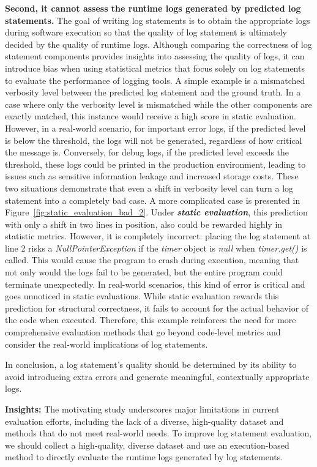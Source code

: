 \textbf{Second, it cannot assess the runtime logs generated by predicted log statements. }
The goal of writing log statements is to obtain the appropriate logs during software execution so that the quality of log statement is ultimately decided by the quality of runtime logs. 
Although comparing the correctness of log statement components provides insights into assessing the quality of logs, it can introduce bias when using statistical metrics that focus solely on log statements to evaluate the performance of logging tools.
A simple example is a mismatched verbosity level between the predicted log statement and the ground truth. In a case where only the verbosity level is mismatched while the other components are exactly matched, this instance would receive a high score in static evaluation. However, in a real-world scenario, for important error logs, if the predicted level is below the threshold, the logs will not be generated, regardless of how critical the message is. Conversely, for debug logs, if the predicted level exceeds the threshold, these logs could be printed in the production environment, leading to issues such as sensitive information leakage and increased storage costs. These two situations demonstrate that even a shift in verbosity level can turn a log statement into a completely bad case.
A more complicated case is presented in Figure~\ref{fig:static_evaluation_bad_2}. Under \textit{\textbf{static evaluation}}, this prediction with only a shift in two lines in position, also could be rewarded highly in statistic metrics. 
However, it is completely incorrect: placing the log statement at line 2 risks a \textit{NullPointerException} if the \textit{timer} object is \textit{null} when \textit{timer.get()} is called. This would cause the program to crash during execution, meaning that not only would the logs fail to be generated, but the entire program could terminate unexpectedly.
In real-world scenarios, this kind of error is critical and goes unnoticed in static evaluations. While static evaluation rewards this prediction for structural correctness, it fails to account for the actual behavior of the code when executed. Therefore, this example reinforces the need for more comprehensive evaluation methods that go beyond code-level metrics and consider the real-world implications of log statements. 

In conclusion, a log statement’s quality should be determined by its ability to avoid introducing extra errors and generate meaningful, contextually appropriate logs.

    

\begin{tcolorbox}
\textbf{Insights:} The motivating study underscores major limitations in current evaluation efforts, including the lack of a diverse, high-quality dataset and methods that do not meet real-world needs. To improve log statement evaluation, we should collect a high-quality, diverse dataset and use an execution-based method to directly evaluate the runtime logs generated by log statements.
\end{tcolorbox}